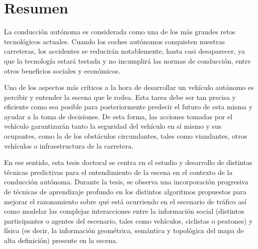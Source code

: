 %
%
%
% 
%
%
%
%

\chapter*{Resumen}
\label{cha:resumen}


La conducción autónoma es considerada como una de los más grandes retos tecnológicos actuales. Cuando los coches autónomos conquisten nuestras carreteras, los accidentes se reducirán notablemente, hasta casi desaparecer, ya que la tecnología estará testada y no incumplirá las normas de conducción, entre otros beneficios sociales y económicos.

Uno de los aspectos más críticos a la hora de desarrollar un vehículo autónomo es percibir y entender la escena que le rodea. Esta tarea debe ser tan precisa y eficiente como sea posible para posteriormente predecir el futuro de esta misma y ayudar a la toma de decisiones. De esta forma, las acciones tomadas por el vehículo garantizarán tanto la seguridad del vehículo en sí mismo y sus ocupantes, como la de los obstáculos circundantes, tales como viandantes, otros vehículos o infraestructura de la carretera.

En ese sentido, esta tesis doctoral se centra en el estudio y desarrollo de distintas técnicas predictivas para el entendimiento de la escena en el contexto de la conducción autónoma. Durante la tesis, se observa una incorporación progresiva de técnicas de aprendizaje profundo en los distintos algoritmos propuestos para mejorar el razonamiento sobre qué está ocurriendo en el escenario de tráfico así como modelar las complejas interacciones entre la información social (distintos participantes o agentes del escenario, tales como vehículos, ciclistas o peatones) y física (es decir, la información geométrica, semántica y topológica del mapa de alta definición) presente en la escena. 

